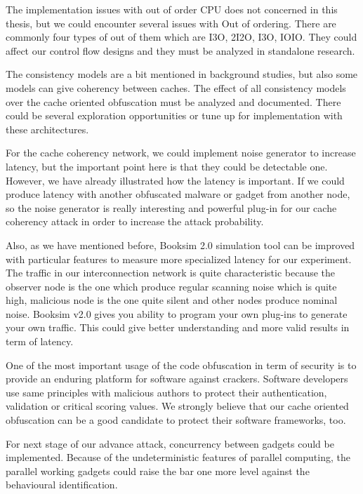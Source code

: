 The implementation issues with out of order CPU does not concerned in this thesis, but we could encounter several issues with Out of ordering. There are commonly four types of out of them which are I3O, 2I2O,  I3O, IOIO. They could affect our control flow designs and they must be analyzed in standalone research.

The consistency models are a bit mentioned in background studies, but also some models can give coherency between caches. The effect of all consistency models over the cache oriented obfuscation must be analyzed and documented. There could be several exploration opportunities or tune up for implementation with these architectures. 

For the cache coherency network, we could implement noise generator to increase latency, but the important point here is that they could be detectable one. However, we have already illustrated how the latency is important. If we could produce latency with another obfuscated malware or gadget from another node, so the noise generator is really interesting and powerful plug-in for our cache coherency attack in order to increase the attack probability.

Also, as we have mentioned before, Booksim 2.0 simulation tool can be improved with particular features to measure more specialized latency for our experiment. The traffic in our interconnection network is quite characteristic because the observer node is the one which produce regular scanning noise which is quite high, malicious node is the one quite silent and other nodes produce nominal noise.  Booksim v2.0 gives you ability to program your own plug-ins to generate your own traffic. This could give better understanding and more valid results in term of latency. 

One of the most important usage of the code obfuscation in term of security is to provide an enduring platform for software against crackers. Software developers use same principles with malicious authors to protect their authentication, validation or critical scoring values. We strongly believe that our cache oriented obfuscation can be a good candidate to protect their software frameworks, too. 

For next stage of our advance attack, concurrency between gadgets could be implemented. Because of the undeterministic features of parallel computing, the parallel working gadgets could raise the bar one more level against the behavioural identification.